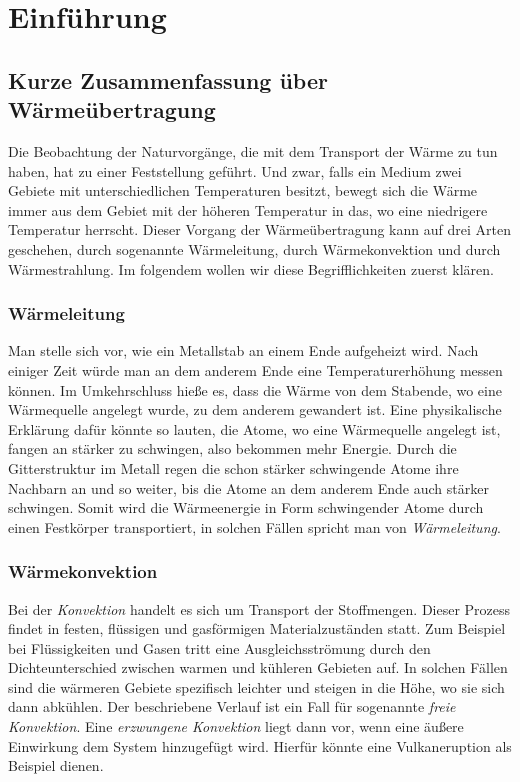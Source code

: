 \chapter{Einführung}
\label{cha:1}

\section{Kurze Zusammenfassung über Wärmeübertragung}

Die Beobachtung der Naturvorgänge, die mit dem Transport der Wärme zu tun haben, hat zu einer Feststellung geführt. Und zwar, falls ein Medium zwei Gebiete mit unterschiedlichen Temperaturen besitzt, bewegt sich die Wärme immer aus dem Gebiet mit der höheren Temperatur in das, wo eine niedrigere Temperatur herrscht. Dieser Vorgang der Wärmeübertragung kann auf drei Arten geschehen, durch sogenannte Wärmeleitung, durch Wärmekonvektion und durch Wärmestrahlung. Im folgendem wollen wir diese Begrifflichkeiten zuerst klären.

\subsection{Wärmeleitung}

Man stelle sich vor, wie ein Metallstab an einem Ende aufgeheizt wird. Nach einiger Zeit würde man an dem anderem Ende eine Temperaturerhöhung messen können. Im Umkehrschluss hieße es, dass die Wärme von dem Stabende, wo eine Wärmequelle angelegt wurde, zu dem anderem gewandert ist. Eine physikalische Erklärung dafür könnte so lauten, die Atome, wo eine Wärmequelle angelegt ist, fangen an stärker zu schwingen, also bekommen mehr Energie. Durch die Gitterstruktur im Metall regen die schon stärker schwingende Atome ihre Nachbarn an und so weiter, bis die Atome an dem anderem Ende auch stärker schwingen. Somit wird die Wärmeenergie in Form schwingender Atome durch einen Festkörper transportiert, in solchen Fällen spricht man von \textit{Wärmeleitung}.

\subsection{Wärmekonvektion}

Bei der \textit{Konvektion} handelt es sich um Transport der Stoffmengen. Dieser Prozess findet in festen, flüssigen und gasförmigen Materialzuständen statt. Zum Beispiel bei Flüssigkeiten und Gasen tritt eine Ausgleichsströmung durch den Dichteunterschied zwischen warmen und kühleren Gebieten auf. In solchen Fällen sind die wärmeren Gebiete spezifisch leichter und steigen in die Höhe, wo sie sich dann abkühlen. Der beschriebene Verlauf ist ein Fall für sogenannte \textit{freie Konvektion}. Eine \textit{erzwungene Konvektion} liegt dann vor, wenn eine äußere Einwirkung dem System hinzugefügt wird. Hierfür könnte eine Vulkaneruption als Beispiel dienen. 

